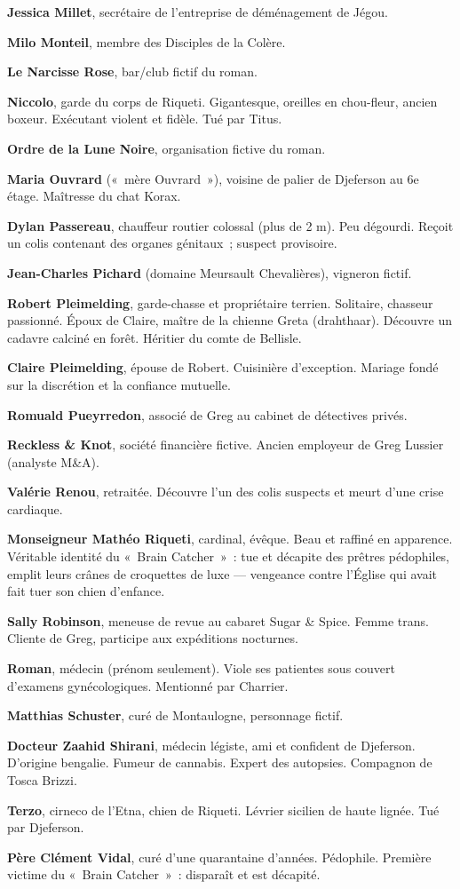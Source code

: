 \textbf{Jessica Millet}, secrétaire de l'entreprise de déménagement de Jégou.

\textbf{Milo Monteil}, membre des Disciples de la Colère.

\textbf{Le Narcisse Rose}, bar/club fictif du roman.

\textbf{Niccolo}, garde du corps de Riqueti. Gigantesque, oreilles en chou-fleur, ancien boxeur. Exécutant violent et fidèle. Tué par Titus.

\textbf{Ordre de la Lune Noire}, organisation fictive du roman.

\textbf{Maria Ouvrard} («~mère Ouvrard~»), voisine de palier de Djeferson au 6e étage. Maîtresse du chat Korax.

\textbf{Dylan Passereau}, chauffeur routier colossal (plus de 2 m). Peu dégourdi. Reçoit un colis contenant des organes génitaux~; suspect provisoire.

\textbf{Jean-Charles Pichard} (domaine Meursault Chevalières), vigneron fictif.

\textbf{Robert Pleimelding}, garde-chasse et propriétaire terrien. Solitaire, chasseur passionné. Époux de Claire, maître de la chienne Greta (drahthaar). Découvre un cadavre calciné en forêt. Héritier du comte de Bellisle.

\textbf{Claire Pleimelding}, épouse de Robert. Cuisinière d'exception. Mariage fondé sur la discrétion et la confiance mutuelle.

\textbf{Romuald Pueyrredon}, associé de Greg au cabinet de détectives privés.

\textbf{Reckless \& Knot}, société financière fictive. Ancien employeur de Greg Lussier (analyste M\&A).

\textbf{Valérie Renou}, retraitée. Découvre l'un des colis suspects et meurt d'une crise cardiaque.

\textbf{Monseigneur Mathéo Riqueti}, cardinal, évêque. Beau et raffiné en apparence. Véritable identité du «~Brain Catcher~»~: tue et décapite des prêtres pédophiles, emplit leurs crânes de croquettes de luxe --- vengeance contre l'Église qui avait fait tuer son chien d'enfance.

\textbf{Sally Robinson}, meneuse de revue au cabaret Sugar \& Spice. Femme trans. Cliente de Greg, participe aux expéditions nocturnes.

\textbf{Roman}, médecin (prénom seulement). Viole ses patientes sous couvert d'examens gynécologiques. Mentionné par Charrier.

\textbf{Matthias Schuster}, curé de Montaulogne, personnage fictif.

\textbf{Docteur Zaahid Shirani}, médecin légiste, ami et confident de Djeferson. D'origine bengalie. Fumeur de cannabis. Expert des autopsies. Compagnon de Tosca Brizzi.

\textbf{Terzo}, cirneco de l'Etna, chien de Riqueti. Lévrier sicilien de haute lignée. Tué par Djeferson.

\textbf{Père Clément Vidal}, curé d'une quarantaine d'années. Pédophile. Première victime du «~Brain Catcher~»~: disparaît et est décapité.
